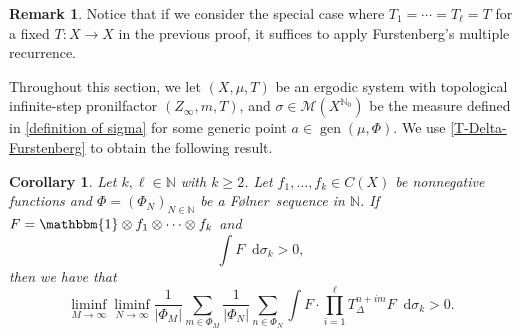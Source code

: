 \documentclass[letter, 11pt]{article}
\newcommand{\Folner}{F\o{}lner}
\newtheorem{cor}[theo]{Corollary}
\theoremstyle{definition}
\newtheorem*{remark*}{Remark}
\theoremstyle{plain}
\newcommand{\N}{\mathbb{N}}
\DeclareMathOperator\gen{gen}
\newcommand*\diff{\mathop{}\!\mathrm{d}}
\newcommand{\1}{\mathbbm{1}}
\begin{document}
\begin{remark*}
    Notice that if we consider the special case where $T_1 = \cdots = T_{\ell}  = T$ for a fixed $T \colon X \to X$ in the previous proof, it suffices to apply Furstenberg's multiple recurrence. 
\end{remark*}

Throughout this section, we let $(X,\mu,T)$ be an ergodic system with topological infinite-step pronilfactor $(Z_{\infty},m,T)$, and $\sigma\in \mathcal{M}(X^{\N_0})$ be the measure defined in \cref{definition of sigma} for some generic point $a\in \gen(\mu,\Phi)$.
We use \cref{T-Delta-Furstenberg} to obtain the following result. 
\begin{cor}\label{T-Delta-Furstenberg-cor}
       Let $k,\ell \in \N$ with $k\geq 2$. Let $f_1, \ldots, f_k  \in C(X)$ be nonnegative functions and $\Phi=(\Phi_N)_{N\in \N}$ be a \Folner\ sequence in $\N$. If $F=\1\otimes f_1\otimes\cdots \otimes f_k$ and
    $$\int F\diff \sigma_k>0, $$ 
   then we have that 
    $$  \liminf_{M\to\infty}\liminf_{N\to\infty}\frac{1}{|\Phi_M|} \sum_{m\in \Phi_M}  \frac{1}{|\Phi_N|} \sum_{n\in \Phi_N} \int F \cdot \prod_{i=1}^{\ell}  T_{\Delta}^{n+im} F \diff\sigma_{k}>0.$$  
\end{cor}
\end{document}
